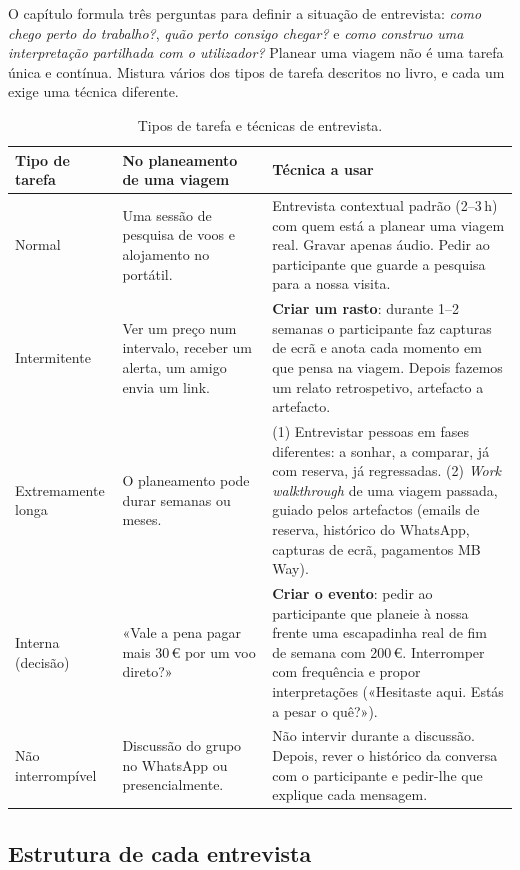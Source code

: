 \documentclass[11pt,a4paper]{article}
\begin{document}
O capítulo formula três perguntas para definir a situação de entrevista: \textit{como chego perto do trabalho?}, \textit{quão perto consigo chegar?} e \textit{como construo uma interpretação partilhada com o utilizador?} Planear uma viagem não é uma tarefa única e contínua. Mistura vários dos tipos de tarefa descritos no livro, e cada um exige uma técnica diferente.

\begin{table}[h]
\centering
\small
\begin{tabularx}{\textwidth}{@{}p{2.5cm}p{4.2cm}L@{}}
\toprule
\textbf{Tipo de tarefa} & \textbf{No planeamento de uma viagem} & \textbf{Técnica a usar} \\
\midrule
Normal & Uma sessão de pesquisa de voos e alojamento no portátil. & Entrevista contextual padrão (2--3\,h) com quem está a planear uma viagem real. Gravar apenas áudio. Pedir ao participante que guarde a pesquisa para a nossa visita. \\
Intermitente & Ver um preço num intervalo, receber um alerta, um amigo envia um link. & \textbf{Criar um rasto}: durante 1--2 semanas o participante faz capturas de ecrã e anota cada momento em que pensa na viagem. Depois fazemos um relato retrospetivo, artefacto a artefacto. \\
Extremamente longa & O planeamento pode durar semanas ou meses. & (1) Entrevistar pessoas em fases diferentes: a sonhar, a comparar, já com reserva, já regressadas. (2) \textit{Work walkthrough} de uma viagem passada, guiado pelos artefactos (emails de reserva, histórico do WhatsApp, capturas de ecrã, pagamentos MB Way). \\
Interna (decisão) & «Vale a pena pagar mais 30\,€ por um voo direto?» & \textbf{Criar o evento}: pedir ao participante que planeie à nossa frente uma escapadinha real de fim de semana com 200\,€. Interromper com frequência e propor interpretações («Hesitaste aqui. Estás a pesar o quê?»). \\
Não interrompível & Discussão do grupo no WhatsApp ou presencialmente. & Não intervir durante a discussão. Depois, rever o histórico da conversa com o participante e pedir-lhe que explique cada mensagem. \\
\bottomrule
\end{tabularx}
\caption{Tipos de tarefa e técnicas de entrevista.}
\end{table}

\subsection{Estrutura de cada entrevista}
\end{document}
